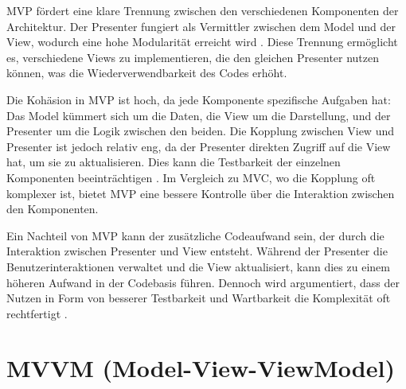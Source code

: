 MVP fördert eine klare Trennung zwischen den verschiedenen
Komponenten der Architektur. Der Presenter fungiert als Vermittler
zwischen dem Model und der View, wodurch eine hohe Modularität
erreicht wird \cite{qureshi2024}. Diese Trennung ermöglicht
es, verschiedene Views zu implementieren, die den gleichen
Presenter nutzen können, was die Wiederverwendbarkeit des Codes
erhöht.

Die Kohäsion in MVP ist hoch, da jede Komponente spezifische
Aufgaben hat: Das Model kümmert sich um die Daten, die View
um die Darstellung, und der Presenter um die Logik zwischen
den beiden. Die Kopplung zwischen View und Presenter ist
jedoch relativ eng, da der Presenter direkten Zugriff auf die
View hat, um sie zu aktualisieren. Dies kann die Testbarkeit
der einzelnen Komponenten beeinträchtigen \cite{aihara2012mvc}. Im
Vergleich zu MVC, wo die Kopplung oft komplexer ist, bietet
MVP eine bessere Kontrolle über die Interaktion zwischen den
Komponenten.

Ein Nachteil von MVP kann der zusätzliche Codeaufwand sein,
der durch die Interaktion zwischen Presenter und View entsteht.
Während der Presenter die Benutzerinteraktionen verwaltet und
die View aktualisiert, kann dies zu einem höheren Aufwand in
der Codebasis führen. Dennoch wird argumentiert, dass der
Nutzen in Form von besserer Testbarkeit und Wartbarkeit die
Komplexität oft rechtfertigt \cite{qureshi2024}. 

\section{MVVM (Model-View-ViewModel)}


